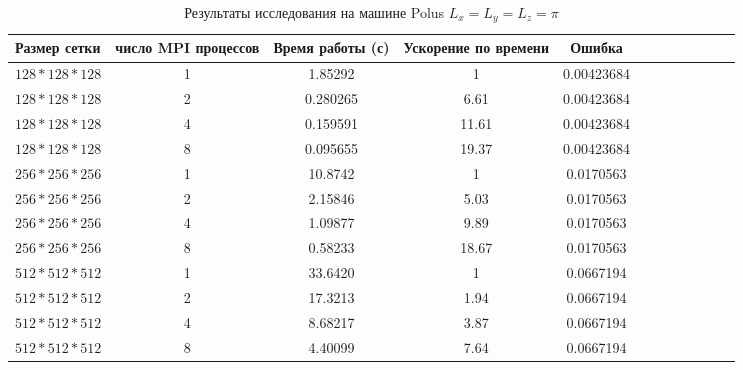 \documentclass{article}
\begin{document}
       \begin{table*}[!t]
        \centering
        \caption{Результаты исследования на машине Polus \(L_x = L_y = L_z = \pi\)}\label{tab:tab1}
        \begin{tabularx}{\textwidth}{@{}l*{10}{C}c@{}} %
            \toprule
            \bf Размер сетки & \bf число MPI процессов  & \bf Время работы (с) & \bf Ускорение по времени & \bf Ошибка \\
                \midrule
                \(128*128*128\) & 1 & 1.85292  & 1     & 0.00423684\\
                \(128*128*128\) & 2 & 0.280265 & 6.61  & 0.00423684\\
                \(128*128*128\) & 4 & 0.159591 & 11.61  & 0.00423684\\
                \(128*128*128\) & 8 & 0.095655 & 19.37  & 0.00423684\\
                \midrule
                \(256*256*256\) & 1 & 10.8742 & 1     & 0.0170563 \\
                \(256*256*256\) & 2 & 2.15846 & 5.03  & 0.0170563 \\
                \(256*256*256\) & 4 & 1.09877 & 9.89  & 0.0170563 \\
                \(256*256*256\) & 8 & 0.58233 & 18.67 & 0.0170563 \\
                \midrule
                \(512*512*512\) & 1 & 33.6420 & 1      & 0.0667194 \\
                \(512*512*512\) & 2 & 17.3213 & 1.94   & 0.0667194 \\
                \(512*512*512\) & 4 & 8.68217 & 3.87   & 0.0667194 \\
                \(512*512*512\) & 8 & 4.40099 & 7.64   & 0.0667194 \\
                \bottomrule
            \end{tabularx}
        \end{table*}
        \clearpage
\end{document}

